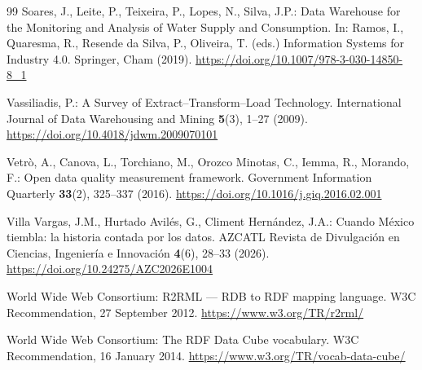 \documentclass[runningheads]{llncs}
\newif\ifmarcarcambios
\newcommand{\icokg}[1]{\ifmarcarcambios\textcolor{nuevo}{#1}\else#1\fi}
\renewcommand{\_}{\origunderscore\allowbreak}
\begin{document}
\begin{thebibliography}{99}
 Soares, J., Leite, P., Teixeira, P., Lopes, N., Silva, J.P.: Data Warehouse for the Monitoring and Analysis of Water Supply and Consumption. In: Ramos, I., Quaresma, R., Resende da Silva, P., Oliveira, T. (eds.) Information Systems for Industry 4.0. Springer, Cham (2019). \url{https://doi.org/10.1007/978-3-030-14850-8_1}

 Vassiliadis, P.: A Survey of Extract--Transform--Load Technology. International Journal of Data Warehousing and Mining \textbf{5}(3), 1--27 (2009). \url{https://doi.org/10.4018/jdwm.2009070101}

 Vetr\`o, A., Canova, L., Torchiano, M., Orozco Minotas, C., Iemma, R., Morando, F.: Open data quality measurement framework. Government Information Quarterly \textbf{33}(2), 325--337 (2016). \url{https://doi.org/10.1016/j.giq.2016.02.001}

 \icokg{Villa Vargas, J.M., Hurtado Avil\'es, G., Climent Hern\'andez, J.A.: Cuando M\'exico tiembla: la historia contada por los datos. AZCATL Revista de Divulgaci\'on en Ciencias, Ingenier\'ia e Innovaci\'on \textbf{4}(6), 28--33 (2026). \url{https://doi.org/10.24275/AZC2026E1004}}

\icokg{ World Wide Web Consortium: R2RML --- RDB to RDF mapping language. W3C Recommendation, 27 September 2012. \url{https://www.w3.org/TR/r2rml/}}

\icokg{ World Wide Web Consortium: The RDF Data Cube vocabulary. W3C Recommendation, 16 January 2014. \url{https://www.w3.org/TR/vocab-data-cube/}}

\end{thebibliography}\endgroup
\end{document}
